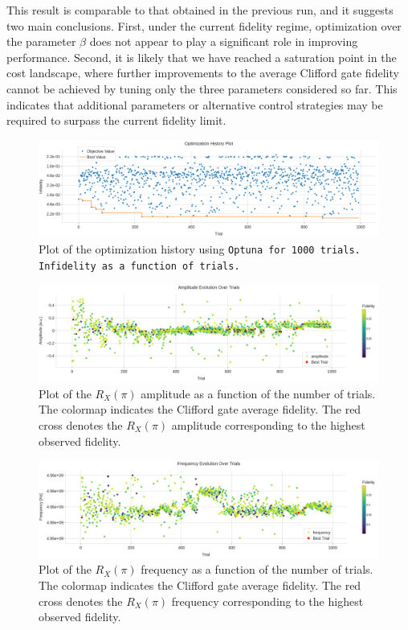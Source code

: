 This result is comparable to that obtained in the previous run, and it suggests two main conclusions. 
First, under the current fidelity regime, optimization over the parameter $\beta$ does not appear to play a significant role in improving performance. 
Second, it is likely that we have reached a saturation point in the cost landscape, where further improvements to the average Clifford gate fidelity cannot be achieved by tuning only the three parameters considered so far. 
This indicates that additional parameters or alternative control strategies may be required to surpass the current fidelity limit.

\begin{figure}[h!]
    \centering
    \includegraphics[width=\textwidth]{figures/png/RB_optimization/Optuna/1000/optimization.png}
    \caption{Plot of the optimization history using \tt{Optuna} for 1000 trials. Infidelity as a function of trials.}
    \label{fig:optuna1000:optimization}
\end{figure}

\begin{figure}[h!]
    \centering
    \includegraphics[width=\textwidth]{figures/png/RB_optimization/Optuna/1000/amplitude.png}
    \caption{Plot of the $R_X(\pi)$ amplitude as a function of the number of trials.     
    The colormap indicates the Clifford gate average fidelity. 
     The red cross denotes the $R_X(\pi)$ amplitude corresponding to the highest observed fidelity.}
    \label{fig:optuna1000:amplitude}
\end{figure}

\begin{figure}[h!]
    \centering
    \includegraphics[width=\textwidth]{figures/png/RB_optimization/Optuna/1000/frequency.png}
    \caption{Plot of the $R_X(\pi)$ frequency as a function of the number of trials. 
    The colormap indicates the Clifford gate average fidelity.  
    The red cross denotes the $R_X(\pi)$ frequency corresponding to the highest observed fidelity.}
    \label{fig:optuna1000:frequency}
\end{figure}

